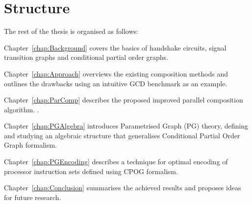 \section{Structure}

The rest of the thesis is organised as follows:

Chapter~\ref{chap:Background} covers the basics of handshake circuits, signal transition graphs and conditional partial order graphs.

Chapter~\ref{chap:Approach} overviews the existing composition methods and outlines the drawbacks using an intuitive GCD benchmark as an example.

Chapter~\ref{chap:ParComp} describes the proposed improved parallel composition algorithm.  .

Chapter~\ref{chap:PGAlgebra} introduces Parametrised Graph (PG) theory, defining and studying an algebraic structure that generalises Conditional Partial Order Graph formalism.

Chapter~\ref{chap:PGEncoding} describes a technique for optimal encoding of processor instruction sets defined using CPOG formalism.

Chapter~\ref{chap:Conclusion} summarises the achieved results and proposes ideas for future research.

